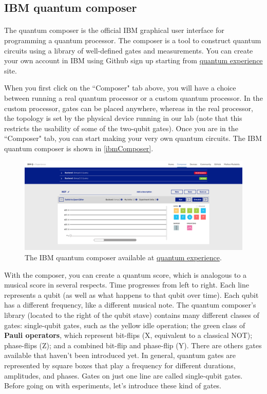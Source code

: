 \documentclass[a4paper,10pt]{article}
\begin{document}
\subsection{IBM quantum composer}

\paragraph{} The quantum composer is the official IBM graphical user interface for programming a quantum processor. The composer is a tool to construct quantum circuits using a library of well-defined gates and measurements. You can create your own account in IBM using Github sign up starting from \href{https://quantumexperience.ng.bluemix.net/}{quantum experience} site.

When you first click on the ``Composer" tab above, you will have a choice between running a real quantum processor or a custom quantum processor. In the custom processor, gates can be placed anywhere, whereas in the real processor, the topology is set by the physical device running in our lab (note that this restricts the usability of some of the two-qubit gates).
Once you are in the ``Composer" tab, you can start making your very own quantum circuits. The IBM quantum composer is shown in \autoref{ibmComposer}.

\begin{figure}[!htb]
\begin{center}
\includegraphics[width=4.7in]{images/ibmComposer.png}
\caption{The IBM quantum composer available at \href{https://quantumexperience.ng.bluemix.net/}{quantum experience}.}
\label{ibmComposer}
\end{center}
\end{figure}

With the composer, you can create a quantum score, which is analogous to a musical score in several respects. Time progresses from left to right. Each line represents a qubit (as well as what happens to that qubit over time). Each qubit has a different frequency, like a different musical note. The quantum composer's library (located to the right of the qubit stave) contains many different classes of gates: single-qubit gates, such as the yellow idle operation; the green class of \textbf{Pauli operators}, which represent bit-flips (X, equivalent to a classical NOT); phase-flips (Z); and a combined bit-flip and phase-flip (Y). There are others gates available that haven't been introduced yet. In general, quantum gates are represented by square boxes that play a frequency for different durations, amplitudes, and phases. Gates on just one line are called single-qubit gates. Before going on with esperiments, let's introduce these kind of gates.
\end{document}
